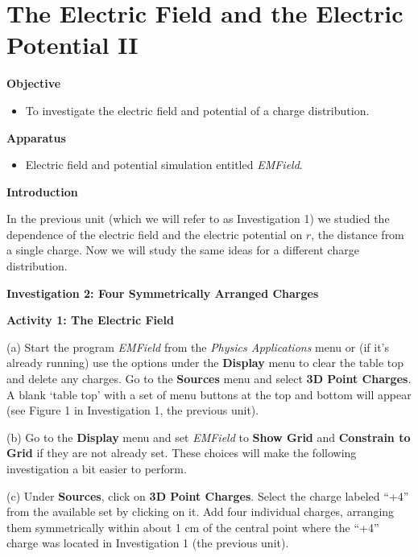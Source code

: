 
\section{The Electric Field and the Electric Potential II}

\makelabheader %

\textbf{Objective}

\begin{itemize}
\item To investigate the electric field and potential of a charge distribution.
\end{itemize}

\textbf{Apparatus}

\begin{itemize}
\item Electric field and potential simulation entitled {\it EMField}.
\end{itemize}

\textbf{Introduction}

In the previous unit (which we will refer to as Investigation 1) we studied the dependence
of the electric field and the electric potential on $r$, the distance from a
single charge.
Now we will study the same ideas for a different charge distribution.

\textbf{Investigation 2: Four Symmetrically Arranged Charges}

\textbf{Activity 1: The Electric Field}

(a) Start the program {\it EMField} from the {\it Physics Applications} menu or (if it's already running) use the options under the 
\textbf{Display} menu to clear the table top and delete any charges.
Go to the \textbf{Sources} menu and select \textbf{3D Point Charges}.
A blank `table top' with a set of menu 
buttons at the top and bottom will appear (see Figure 1 in Investigation 1, the previous unit).

(b) Go to the \textbf{Display} menu and set {\it EMField} to
{\bf Show Grid} and {\bf Constrain to Grid} if they are not already set.
These choices will make the following investigation a bit easier to perform.

(c) Under \textbf{Sources}, click on \textbf{3D Point Charges}. Select the
charge labeled {}``+4'' from the available set by clicking on it.
Add four individual charges, arranging them symmetrically within about
1 cm of the central point where the {}``+4'' charge was located
in Investigation 1 (the previous unit). 

